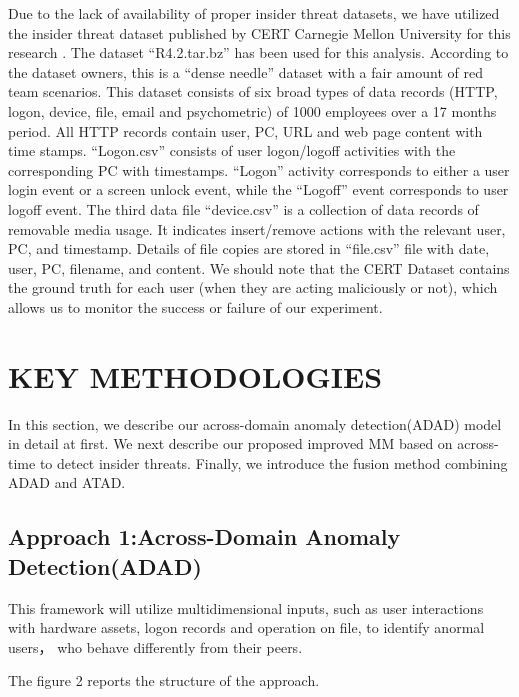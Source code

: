 \documentclass[conference]{IEEEtran}
\begin{document}
Due to the lack of availability of proper insider threat datasets, we have utilized the insider threat
dataset published by CERT Carnegie Mellon University for this research \cite{b39}. The dataset “R4.2.tar.bz” has been used for this analysis. According to the dataset owners, this is a “dense needle” dataset with a fair amount of red team scenarios. This dataset consists of six broad types of data records (HTTP, logon, device, file, email and psychometric) of 1000 employees over a 17 months period. 
All HTTP records contain user, PC, URL and web page content with time stamps. “Logon.csv” consists of user logon/logoff activities with the corresponding PC with timestamps. “Logon” activity corresponds to either a user login event or a screen unlock event, while the “Logoff” event corresponds to user logoff event.  The third data file “device.csv” is a collection of data records of removable media usage. It indicates insert/remove actions with the relevant user, PC, and timestamp. Details of file copies are stored in “file.csv” file with date, user, PC, filename, and content.
We should note that the CERT Dataset contains the ground truth for each user (when they are acting maliciously or not), which allows us to monitor the success or failure of our experiment.

\section{KEY METHODOLOGIES}
In this section, we describe our across-domain anomaly detection(ADAD) model in detail at first. We next describe our proposed improved MM based on across-time to detect insider threats. Finally, we introduce the fusion method combining ADAD and ATAD.


\subsection{Approach 1:Across-Domain Anomaly Detection(ADAD)}\label{AA}

This framework will utilize multidimensional inputs, such as user interactions with hardware
assets, logon records and operation on file, to identify anormal users， who behave differently from their peers.

The figure 2 reports the structure of the approach.
\end{document}
